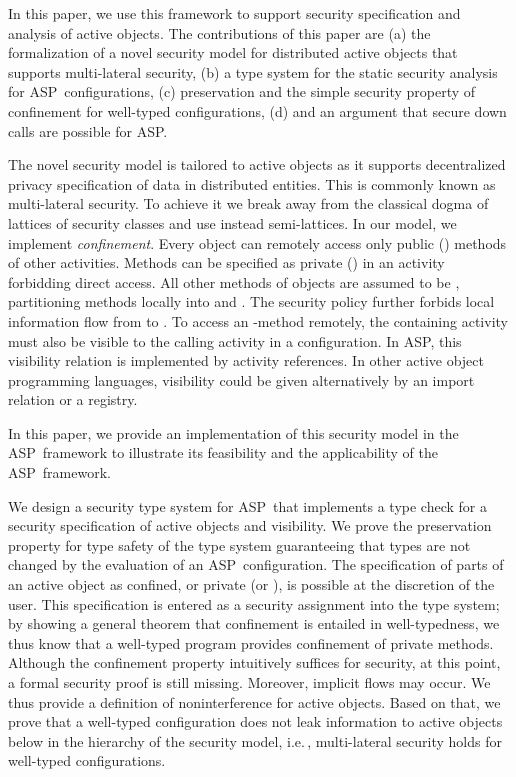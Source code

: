 \documentclass[10pt, conference, compsocconf]{IEEEtran}
\newcommand\aspfun{ASP\ }
\newcommand\aspfunp{ASP}
\newcommand\ie{i.e.\!\,, }
\begin{document}
In this paper, we use this framework to support security specification and analysis of
active objects.
The contributions of this paper are 
(a) the formalization of a novel security model for distributed active objects 
    that supports multi-lateral security,
(b) a type system for the static security analysis for \aspfun configurations,
(c) preservation and the simple security property of confinement for well-typed configurations,
(d) and an argument that secure down calls are possible for \aspfunp.

The novel security model \cite{kam:12} is tailored to active objects as it supports
decentralized privacy specification of data in distributed entities.
This is commonly known as multi-lateral security. To achieve it we break away from 
the classical dogma of lattices of security classes and use instead semi-lattices. 
In our model, we implement {\it confinement}.
Every object can remotely access only public () methods of other activities. 
Methods can be specified as private () in an activity forbidding direct access.
All other methods of objects are assumed to be , partitioning methods 
locally into  and . 
The security policy further forbids local information flow from  to .
To access an -method remotely,
the containing activity must also be visible to the calling activity in a configuration.
In \aspfunp, this visibility relation is implemented by activity references.
In other active object programming languages, visibility could be given
alternatively by an import relation or a registry. 


In this paper, we provide an implementation of this security model in the \aspfun framework to 
illustrate its feasibility and the applicability of the \aspfun framework.

We design a security type system for \aspfun that implements a type check for a
security specification of active objects and visibility.
We prove the preservation property for type safety of the type system guaranteeing that
types are not changed by the evaluation of an \aspfun configuration.
The specification of parts of an active object as confined, or private (or ), 
is possible at the discretion of the user. This specification is entered as a security 
assignment into the type system;
by showing a general theorem that confinement is entailed in well-typedness, 
we thus know that a well-typed program provides confinement of private methods.
Although the confinement property intuitively suffices for security, at this point, a 
formal security proof is still missing. Moreover, implicit flows may occur.
We thus provide a definition of noninterference for active objects. Based on that, we prove 
that a well-typed configuration does not leak information to active objects below 
in the hierarchy of the security model, \ie multi-lateral security holds for well-typed 
configurations.
\end{document}
